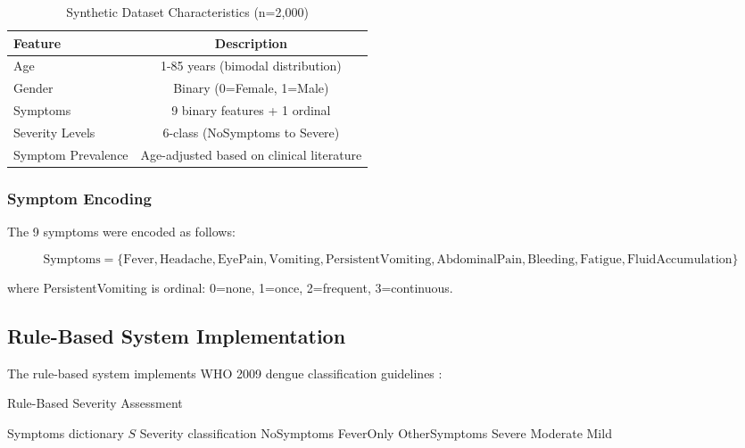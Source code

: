 \documentclass[conference]{IEEEtran}
\begin{document}
\begin{table}[h]
\centering
\caption{Synthetic Dataset Characteristics (n=2,000)}
\label{tab:dataset}
\begin{tabular}{@{}lc@{}}
\toprule
\textbf{Feature} & \textbf{Description} \\
\midrule
Age & 1-85 years (bimodal distribution) \\
Gender & Binary (0=Female, 1=Male) \\
Symptoms & 9 binary features + 1 ordinal \\
Severity Levels & 6-class (NoSymptoms to Severe) \\
Symptom Prevalence & Age-adjusted based on clinical literature \\
\bottomrule
\end{tabular}
\end{table}

\subsubsection{Symptom Encoding}
The 9 symptoms were encoded as follows:

\begin{equation}
\text{Symptoms} = \{ \text{Fever}, \text{Headache}, \text{EyePain}, \text{Vomiting}, \text{PersistentVomiting}, \text{AbdominalPain}, \text{Bleeding}, \text{Fatigue}, \text{FluidAccumulation} \}
\end{equation}

where PersistentVomiting is ordinal: 0=none, 1=once, 2=frequent, 3=continuous.

\subsection{Rule-Based System Implementation}
The rule-based system implements WHO 2009 dengue classification guidelines \cite{who2009}:

\begin{algorithm}[h]
\caption{Rule-Based Severity Assessment}
\begin{algorithmic}[1]
\REQUIRE Symptoms dictionary $S$
\ENSURE Severity classification
    \RETURN NoSymptoms
    \RETURN FeverOnly
    \RETURN OtherSymptoms
        \RETURN Severe
        \RETURN Moderate
    \ELSE
        \RETURN Mild
    \ENDIF
\ENDIF
\end{algorithmic}
\end{algorithm}
\end{document}
